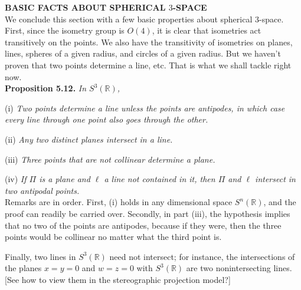 \documentclass[leqno]{book}
\begin{document}
\noindent\textbf{BASIC FACTS ABOUT SPHERICAL $3$-SPACE}\\

\noindent We conclude this section with a few basic properties about spherical 3-space.  First, since the isometry group is $O(4)$, it is clear that isometries act transitively on the points.  We also have the transitivity of isometries on planes, lines, spheres of a given radius, and circles of a given radius.  But we haven't proven that two points determine a line, etc.  That is what we shall tackle right now.\\

\noindent\textbf{Proposition 5.12.} \emph{In $S^3(\mathbb R)$,}

(i) \emph{Two points determine a line unless the points are antipodes, in which case every line through one point also goes through the other.}

(ii) \emph{Any two distinct planes intersect in a line.}

(iii) \emph{Three points that are not collinear determine a plane.}

(iv) \emph{If $\Pi$ is a plane and $\ell$ a line not contained in it, then $\Pi$ and $\ell$ intersect in two antipodal points.}\\

\noindent Remarks are in order.  First, (i) holds in any dimensional space $S^n(\mathbb R)$, and the proof can readily be carried over.  Secondly, in part (iii), the hypothesis implies that no two of the points are antipodes, because if they were, then the three points would be collinear no matter what the third point is.

Finally, two lines in $S^3(\mathbb R)$ need not intersect; for instance, the intersections of the planes $x=y=0$ and $w=z=0$ with $S^3(\mathbb R)$ are two nonintersecting lines.  [See how to view them in the stereographic projection model?]
\end{document}
